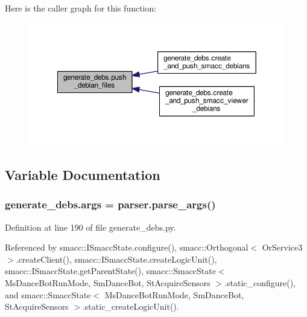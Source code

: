 Here is the caller graph for this function\+:\nopagebreak
\begin{figure}[H]
\begin{center}
\leavevmode
\includegraphics[width=350pt]{namespacegenerate__debs_aac577281b086e6d24e7eb86ce2302398_icgraph}
\end{center}
\end{figure}




\subsection{Variable Documentation}
\subsubsection[{\texorpdfstring{args}{args}}]{\setlength{\rightskip}{0pt plus 5cm}generate\+\_\+debs.\+args = parser.\+parse\+\_\+args()}\hypertarget{namespacegenerate__debs_a75f9143e38df82d83b2e8a6f99cae02c}{}\label{namespacegenerate__debs_a75f9143e38df82d83b2e8a6f99cae02c}


Definition at line 190 of file generate\+\_\+debs.\+py.



Referenced by smacc\+::\+I\+Smacc\+State.\+configure(), smacc\+::\+Orthogonal$<$ Or\+Service3 $>$.\+create\+Client(), smacc\+::\+I\+Smacc\+State.\+create\+Logic\+Unit(), smacc\+::\+I\+Smacc\+State.\+get\+Parent\+State(), smacc\+::\+Smacc\+State$<$ Ms\+Dance\+Bot\+Run\+Mode, Sm\+Dance\+Bot, St\+Acquire\+Sensors $>$.\+static\+\_\+configure(), and smacc\+::\+Smacc\+State$<$ Ms\+Dance\+Bot\+Run\+Mode, Sm\+Dance\+Bot, St\+Acquire\+Sensors $>$.\+static\+\_\+create\+Logic\+Unit().

